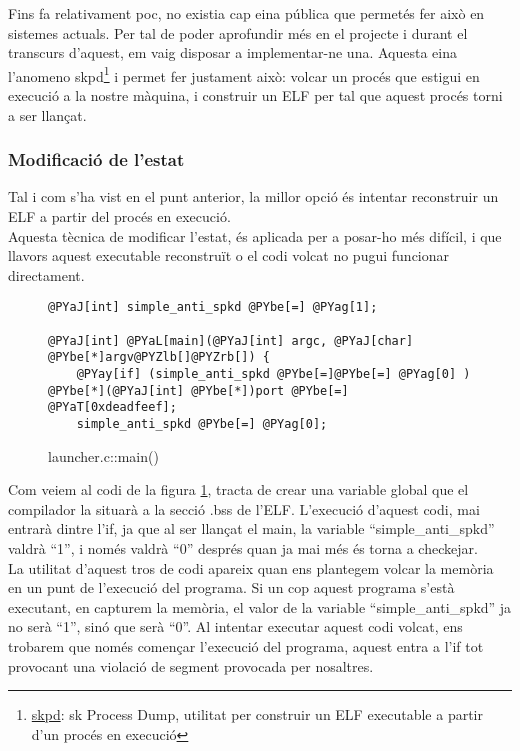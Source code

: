 Fins fa relativament poc, no existia cap eina pública que permetés fer això en sistemes actuals. Per tal 
de poder aprofundir més en el projecte i durant el transcurs d'aquest, em vaig disposar a implementar-ne una.
Aquesta eina l'anomeno skpd\footnote{\href{http://www.wekk.net/skpd/}{skpd}: sk Process Dump, utilitat per
construir un ELF executable a partir d'un procés en execució} i permet fer justament això: volcar un procés 
que estigui en execució a la nostre màquina, i construir un ELF per tal que aquest procés torni a ser llançat. 

\subsubsection{Modificació de l'estat}
Tal i com s'ha vist en el punt anterior, la millor opció és intentar reconstruir un ELF a partir del
procés en execució. \\

Aquesta tècnica de modificar l'estat, és aplicada per a posar-ho més difícil, i que llavors aquest 
executable reconstruït o el codi volcat no pugui funcionar directament. \\

\begin{figure}[htp]
\begin{Verbatim}[commandchars=@\[\]]
@PYaJ[int] simple_anti_spkd @PYbe[=] @PYag[1];

@PYaJ[int] @PYaL[main](@PYaJ[int] argc, @PYaJ[char] @PYbe[*]argv@PYZlb[]@PYZrb[]) {
    @PYay[if] (simple_anti_spkd @PYbe[=]@PYbe[=] @PYag[0] ) @PYbe[*](@PYaJ[int] @PYbe[*])port @PYbe[=] @PYaT[0xdeadfeef];
    simple_anti_spkd @PYbe[=] @PYag[0];
\end{Verbatim}
\caption{launcher.c::main()}
\label{fig:antidebug_modificar_estat}
\end{figure}

Com veiem al codi de la figura \ref{fig:antidebug_modificar_estat}, tracta de crear una variable global que el compilador la situarà a la secció
.bss de l'ELF. L'execució d'aquest codi, mai entrarà dintre l'if, ja que al ser llançat el main, la variable 
``simple\_anti\_spkd'' valdrà ``1'', i només valdrà ``0'' després quan ja mai més és torna a checkejar. \\

La utilitat d'aquest tros de codi apareix quan ens plantegem volcar la memòria en un punt de l'execució del 
programa. Si un cop aquest programa s'està executant, en capturem la memòria, el valor de la 
variable ``simple\_anti\_spkd'' ja no serà ``1'', sinó que serà ``0''. Al intentar executar aquest codi
volcat, ens trobarem que només començar l'execució del programa, aquest entra a l'if tot provocant una 
violació de segment provocada per nosaltres.  \\

